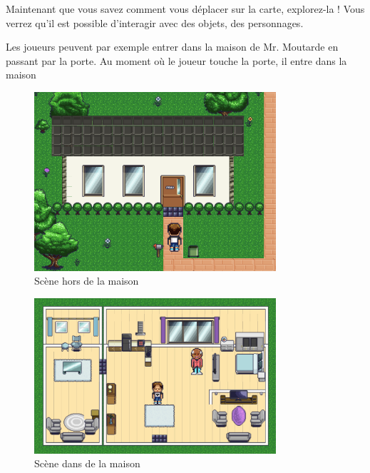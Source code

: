 Maintenant que vous savez comment vous déplacer sur la carte, explorez-la ! Vous verrez qu'il est possible d'interagir avec des objets, des personnages.

Les joueurs peuvent par exemple entrer dans la maison de Mr. Moutarde en passant par la porte. Au moment où le joueur touche la porte, il entre dans la maison
\begin{figure}[H]
    \centering
    \includegraphics[width=0.8\textwidth ]{images/changeScene/changeSceneOut.png}
    \caption{Scène hors de la maison}
    \label{fig:pic_dessus}
\end{figure}

\begin{figure}[H]
    \centering
    \includegraphics[width=0.8\textwidth ]{images/changeScene/changeSceneIn.png}
    \caption{Scène dans de la maison}
    \label{fig:pic_dessus}
\end{figure}